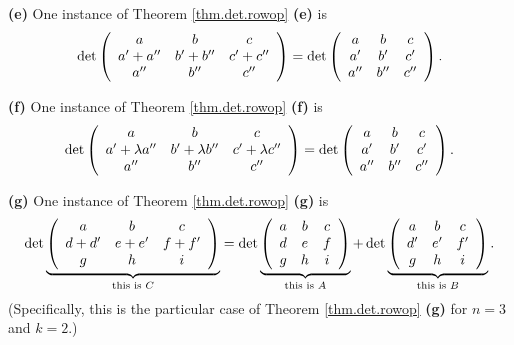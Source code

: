 \begin{example}
\textbf{(e)} One instance of Theorem \ref{thm.det.rowop} \textbf{(e)} is
\[
\det\left(
\begin{array}
[c]{ccc}%
a & b & c\\
a^{\prime}+a^{\prime\prime} & b^{\prime}+b^{\prime\prime} & c^{\prime
}+c^{\prime\prime}\\
a^{\prime\prime} & b^{\prime\prime} & c^{\prime\prime}%
\end{array}
\right)  =\det\left(
\begin{array}
[c]{ccc}%
a & b & c\\
a^{\prime} & b^{\prime} & c^{\prime}\\
a^{\prime\prime} & b^{\prime\prime} & c^{\prime\prime}%
\end{array}
\right)  .
\]


\textbf{(f)} One instance of Theorem \ref{thm.det.rowop} \textbf{(f)} is
\[
\det\left(
\begin{array}
[c]{ccc}%
a & b & c\\
a^{\prime}+\lambda a^{\prime\prime} & b^{\prime}+\lambda b^{\prime\prime} &
c^{\prime}+\lambda c^{\prime\prime}\\
a^{\prime\prime} & b^{\prime\prime} & c^{\prime\prime}%
\end{array}
\right)  =\det\left(
\begin{array}
[c]{ccc}%
a & b & c\\
a^{\prime} & b^{\prime} & c^{\prime}\\
a^{\prime\prime} & b^{\prime\prime} & c^{\prime\prime}%
\end{array}
\right)  .
\]


\textbf{(g)} One instance of Theorem \ref{thm.det.rowop} \textbf{(g)} is%
\[
\det\underbrace{\left(
\begin{array}
[c]{ccc}%
a & b & c\\
d+d^{\prime} & e+e^{\prime} & f+f^{\prime}\\
g & h & i
\end{array}
\right)  }_{\text{this is }C}=\det\underbrace{\left(
\begin{array}
[c]{ccc}%
a & b & c\\
d & e & f\\
g & h & i
\end{array}
\right)  }_{\text{this is }A}+\det\underbrace{\left(
\begin{array}
[c]{ccc}%
a & b & c\\
d^{\prime} & e^{\prime} & f^{\prime}\\
g & h & i
\end{array}
\right)  }_{\text{this is }B}.
\]
(Specifically, this is the particular case of Theorem \ref{thm.det.rowop}
\textbf{(g)} for $n=3$ and $k=2$.)
\end{example}

